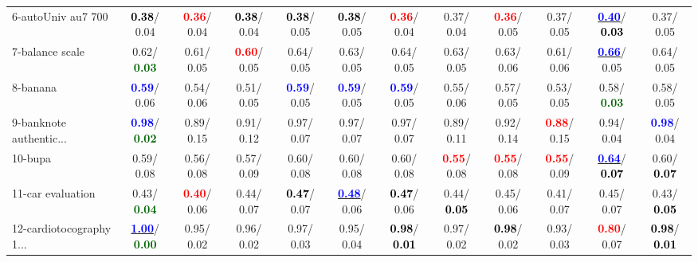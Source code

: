 \begin{table}[h]
\begin{center}
{\begin{tabular}{lc|c|c|c|c|c|c|c|c|c|c}
6-autoUniv au7 700 & \textcolor{black}{\textbf{  0.38}}/  0.04 & \textcolor{red}{\textbf{  0.36}}/  0.04 & \textcolor{black}{\textbf{  0.38}}/  0.04 & \textcolor{black}{\textbf{  0.38}}/  0.05 & \textcolor{black}{\textbf{  0.38}}/  0.05 & \textcolor{red}{\textbf{  0.36}}/  0.04 &   0.37/  0.04 & \textcolor{red}{\textbf{  0.36}}/  0.05 &   0.37/  0.05 & \underline{\textcolor{blue}{\textbf{  0.40}}}/\textcolor{black}{\textbf{  0.03}} &   0.37/  0.05 \\
7-balance scale &   0.62/\textcolor{darkgreen}{\textbf{  0.03}} &   0.61/  0.05 & \textcolor{red}{\textbf{  0.60}}/  0.05 &   0.64/  0.05 &   0.63/  0.05 &   0.64/  0.05 &   0.63/  0.05 &   0.63/  0.06 &   0.61/  0.06 & \underline{\textcolor{blue}{\textbf{  0.66}}}/  0.05 &   0.64/  0.05 \\ \hline
8-banana & \textcolor{blue}{\textbf{  0.59}}/  0.06 &   0.54/  0.06 &   0.51/  0.05 & \textcolor{blue}{\textbf{  0.59}}/  0.05 & \textcolor{blue}{\textbf{  0.59}}/  0.05 & \textcolor{blue}{\textbf{  0.59}}/  0.05 &   0.55/  0.06 &   0.57/  0.05 &   0.53/  0.05 &   0.58/\textcolor{darkgreen}{\textbf{  0.03}} &   0.58/  0.05 \\
9-banknote authentic... & \textcolor{blue}{\textbf{  0.98}}/\textcolor{darkgreen}{\textbf{  0.02}} &   0.89/  0.15 &   0.91/  0.12 &   0.97/  0.07 &   0.97/  0.07 &   0.97/  0.07 &   0.89/  0.11 &   0.92/  0.14 & \textcolor{red}{\textbf{  0.88}}/  0.15 &   0.94/  0.04 & \textcolor{blue}{\textbf{  0.98}}/  0.04 \\
10-bupa &   0.59/  0.08 &   0.56/  0.08 &   0.57/  0.09 &   0.60/  0.08 &   0.60/  0.08 &   0.60/  0.08 & \textcolor{red}{\textbf{  0.55}}/  0.08 & \textcolor{red}{\textbf{  0.55}}/  0.08 & \textcolor{red}{\textbf{  0.55}}/  0.09 & \underline{\textcolor{blue}{\textbf{  0.64}}}/\textcolor{black}{\textbf{  0.07}} &   0.60/\textcolor{black}{\textbf{  0.07}} \\
11-car evaluation &   0.43/\textcolor{darkgreen}{\textbf{  0.04}} & \textcolor{red}{\textbf{  0.40}}/  0.06 &   0.44/  0.07 & \textcolor{black}{\textbf{  0.47}}/  0.07 & \underline{\textcolor{blue}{\textbf{  0.48}}}/  0.06 & \textcolor{black}{\textbf{  0.47}}/  0.06 &   0.44/\textcolor{black}{\textbf{  0.05}} &   0.45/  0.06 &   0.41/  0.07 &   0.45/  0.07 &   0.43/\textcolor{black}{\textbf{  0.05}} \\
12-cardiotocography 1... & \underline{\textcolor{blue}{\textbf{  1.00}}}/\textcolor{darkgreen}{\textbf{  0.00}} &   0.95/  0.02 &   0.96/  0.02 &   0.97/  0.03 &   0.95/  0.04 & \textcolor{black}{\textbf{  0.98}}/\textcolor{black}{\textbf{  0.01}} &   0.97/  0.02 & \textcolor{black}{\textbf{  0.98}}/  0.02 &   0.93/  0.03 & \textcolor{red}{\textbf{  0.80}}/  0.07 & \textcolor{black}{\textbf{  0.98}}/\textcolor{black}{\textbf{  0.01}} \\

\end{tabular}}
\end{center}
\end{table}
